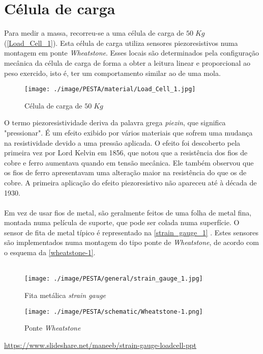 \section{Célula de carga}
Para medir a massa, recorreu-se a uma célula de carga de $50 \; Kg$ (\autoref{Load_Cell_1}). Esta célula de carga utiliza sensores piezoresistivos numa montagem em ponte \textit{Wheatstone}. Esses locais são determinados pela configuração mecânica da célula de carga de forma a obter a leitura linear e proporcional ao peso exercido, isto é, ter um comportamento similar ao de uma mola.
\\
\begin{figure}[H]
	\centering
	\texttt{[image: ./image/PESTA/material/Load\_Cell\_1.jpg]}
	\caption{Célula de carga de $50 \; Kg$}
	\label{Load_Cell_1}
\end{figure}
O termo piezoresistividade deriva da palavra grega \textit{piezin}, que significa "pressionar". É um efeito exibido por vários materiais que sofrem uma mudança na resistividade devido a uma pressão aplicada. O efeito foi descoberto pela primeira vez por Lord Kelvin em 1856, que notou que a resistência dos fios de cobre e ferro aumentava quando em tensão mecânica. Ele também observou que os fios de ferro apresentavam uma alteração maior na resistência do que os de cobre. 
A primeira aplicação do efeito piezoresistivo não apareceu até à década de 1930.
\\
\\
Em vez de usar fios de metal, são geralmente feitos de uma folha de metal fina, montada numa película de suporte, que pode ser colada numa superfície. O sensor de fita de metal típico é representado na \autoref{strain_gauge_1} \cite{book-9}.
Estes sensores são implementados numa montagem do tipo ponte de \textit{Wheatstone}, de acordo com o esquema da \autoref{wheatstone-1}.
\\
\\
\begin{minipage}[!b]{.6\linewidth}
\begin{figure}[H]
	\captionsetup{justification=raggedright,singlelinecheck=false}
	\flushleft
	\texttt{[image: ./image/PESTA/general/strain\_gauge\_1.jpg]}
	\caption{Fita metálica \textit{strain gauge} \cite{book-9}}
	\label{strain_gauge_1}
\end{figure}
\end{minipage}
\begin{minipage}[!b]{.4\linewidth}
\begin{figure}[H]
	\captionsetup{justification=raggedright,singlelinecheck=false}
	\flushleft
	\vspace{1cm}
	\texttt{[image: ./image/PESTA/schematic/Wheatstone-1.png]}
	\qquad \caption{Ponte \textit{Wheatstone}}
	\label{wheatstone-1}
\end{figure}
\end{minipage}
\hspace*{1cm}\url{https://www.slideshare.net/maneeb/strain-gauge-loadcell-ppt}

